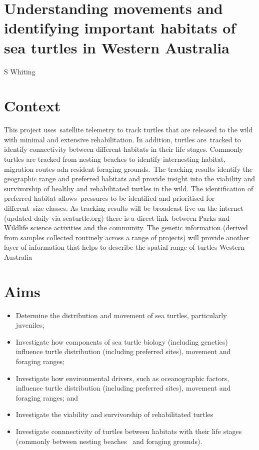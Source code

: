 \documentclass[version=last,
    paper=a4, %
    10pt, %
    usenames,
    dvipsnames,
    oneside, %
    headings=openany, %
    DIV=15 %
]{scrbook}
\begin{document}
\section*{Understanding movements and identifying important habitats of sea
turtles in Western Australia
}

S Whiting


\section*{Context}
This project uses~satellite telemetry to track turtles that are released
to the wild with minimal and extensive rehabilitation. In addition,
turtles are~tracked to identify connectivity between different habitats
in their life stages. Commonly turtles are tracked from nesting beaches
to identify internesting habitat, migration routes adn resident foraging
grounds.~The tracking results identify the geographic range and
preferred habitats and provide insight into the viability and
survivorship of healthy and rehabilitated turtles in the wild. The
identification of preferred habitat allows~pressures to be identified
and prioritised for different~size classes. As tracking results will be
broadcast live on the internet (updated daily via seaturtle.org) there
is a direct link~between Parks and Wildlife science activities and the
community. The genetic information (derived from samples collected
routinely across a range of projects) will provide another layer of
information that helps to describe the spatial range of turtles Western
Australia



\section*{Aims}
\begin{itemize}
\itemsep1pt\parskip0pt
\item
  Determine the distribution and movement of sea turtles, particularly
  juveniles;
\item
  Investigate how components of sea turtle biology (including genetics)
  influence turtle distribution (including preferred sites), movement
  and foraging ranges;
\item
  Investigate how environmental drivers, such as oceanographic factors,
  influence turtle distribution (including preferred sites), movement
  and foraging ranges; and
\item
  Investigate the viability and survivorship of rehabilitated turtles
\item
  Investigate connnectivity of turtles between habitats with their life
  stages (commonly between nesting beaches ~and foraging grounds).
\end{itemize}
\end{document}
